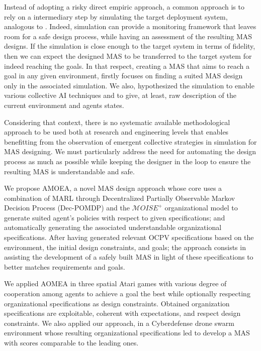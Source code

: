 \documentclass[runningheads]{llncs}
\begin{document}

Instead of adopting a risky direct empiric approach, a common approach is to rely on a intermediary step by simulating the target deployment system, analogous to . Indeed, simulation can provide a monitoring framework that leaves room for a safe design process, while having an assessment of the resulting MAS designs. If the simulation is close enough to the target system in terms of fidelity, then we can expect the designed MAS to be transferred to the target system for indeed reaching the goals.
In that respect, creating a MAS that aims to reach a goal in any given environment, firstly focuses on finding a suited MAS design only in the associated simulation. We also, hypothesized the simulation to enable various collective AI techniques and to give, at least, raw description of the current environment and agents states.

Considering that context, there is no systematic available methodological approach to be used both at research and engineering levels that enables benefitting from the observation of emergent collective strategies in simulation for MAS designing. We must particularly address the need for automating the design process as much as possible while keeping the designer in the loop to ensure the resulting MAS is understandable and safe.


We propose AMOEA, a novel MAS design approach whose core uses a combination of MARL through Decentralized Partially Observable Markov Decision Process (Dec-POMDP) and the $\mathcal{M}OISE^+$ organizational model to generate suited agent's policies with respect to given specifications; and automatically generating the associated understandable organizational specifications. After having generated relevant OCPV specifications based on the environment, the initial design constraints, and goals; the approach consists in assisting the development of a safely built MAS in light of these specifications to better matches requirements and goals.


We applied AOMEA in three spatial Atari games with various degree of cooperation among agents to achieve a goal the best while optionally respecting organizational specifications as design constraints. Obtained organization specifications are exploitable, coherent with expectations, and respect design constraints. We also applied our approach, in a Cyberdefense drone swarm environment whose resulting organizational specifications led to develop a MAS with scores comparable to the leading ones.
\end{document}
